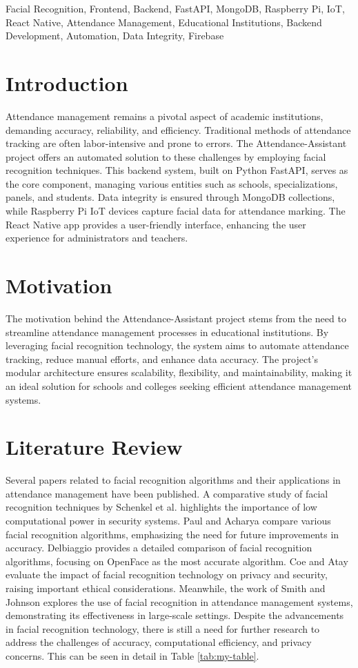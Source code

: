 \documentclass[conference]{IEEEtran}
\begin{document}
\begin{IEEEkeywords}
    Facial Recognition, Frontend, Backend, FastAPI, MongoDB, Raspberry Pi, IoT, React Native, Attendance Management, Educational Institutions, Backend Development, Automation, Data Integrity, Firebase
\end{IEEEkeywords}

\section{Introduction}
Attendance management remains a pivotal aspect of academic institutions, demanding accuracy, reliability, and efficiency. Traditional methods of attendance tracking are often labor-intensive and prone to errors. The Attendance-Assistant project offers an automated solution to these challenges by employing facial recognition techniques. This backend system, built on Python FastAPI, serves as the core component, managing various entities such as schools, specializations, panels, and students. Data integrity is ensured through MongoDB collections, while Raspberry Pi IoT devices capture facial data for attendance marking. The React Native app provides a user-friendly interface, enhancing the user experience for administrators and teachers.

\section{Motivation}
The motivation behind the Attendance-Assistant project stems from the need to streamline attendance management processes in educational institutions. By leveraging facial recognition technology, the system aims to automate attendance tracking, reduce manual efforts, and enhance data accuracy. The project's modular architecture ensures scalability, flexibility, and maintainability, making it an ideal solution for schools and colleges seeking efficient attendance management systems.

\section{Literature Review}
Several papers related to facial recognition algorithms and their applications in attendance management have been published. A comparative study of facial recognition techniques by Schenkel et al. \cite{1} highlights the importance of low computational power in security systems. Paul and Acharya \cite{2} compare various facial recognition algorithms, emphasizing the need for future improvements in accuracy. Delbiaggio \cite{3} provides a detailed comparison of facial recognition algorithms, focusing on OpenFace as the most accurate algorithm. Coe and Atay \cite{4} evaluate the impact of facial recognition technology on privacy and security, raising important ethical considerations. Meanwhile, the work of Smith and Johnson \cite{5} explores the use of facial recognition in attendance management systems, demonstrating its effectiveness in large-scale settings. Despite the advancements in facial recognition technology, there is still a need for further research to address the challenges of accuracy, computational efficiency, and privacy concerns.
This can be seen in detail in Table \ref{tab:my-table}.
\end{document}
